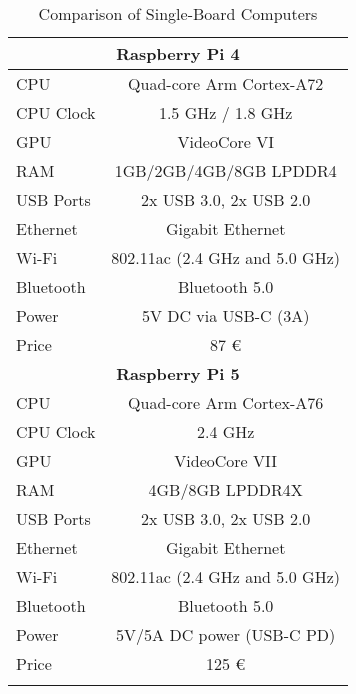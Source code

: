 \begin{longtable}{|l|c|}
	\multicolumn{2}{|c|}{\textbf{Raspberry Pi 4}}                             \\
	\hline
	CPU       & Quad-core Arm Cortex-A72                                      \\
	CPU Clock & 1.5 GHz / 1.8 GHz                                             \\
	GPU       & VideoCore VI                                                  \\
	RAM       & 1GB/2GB/4GB/8GB LPDDR4                                        \\
	USB Ports & 2x USB 3.0, 2x USB 2.0                                        \\
	Ethernet  & Gigabit Ethernet                                              \\
	Wi-Fi     & 802.11ac (2.4 GHz and 5.0 GHz)                                \\
	Bluetooth & Bluetooth 5.0                                                 \\
	Power     & 5V DC via USB-C (3A)                                          \\
	Price     & 87 \euro                                                      \\
	\hline

	\multicolumn{2}{|c|}{\textbf{Raspberry Pi 5}}                             \\
	\hline
	CPU       & Quad-core Arm Cortex-A76                                      \\
	CPU Clock & 2.4 GHz                                                       \\
	GPU       & VideoCore VII                                                 \\
	RAM       & 4GB/8GB LPDDR4X                                               \\
	USB Ports & 2x USB 3.0, 2x USB 2.0                                        \\
	Ethernet  & Gigabit Ethernet                                              \\
	Wi-Fi     & 802.11ac (2.4 GHz and 5.0 GHz)                                \\
	Bluetooth & Bluetooth 5.0                                                 \\
	Power     & 5V/5A DC power (USB-C PD)                                     \\
	Price     & 125 \euro                                                     \\
	\hline

	\caption{Comparison of Single-Board Computers} \label{tab:sbc-comparison} \\
\end{longtable}

